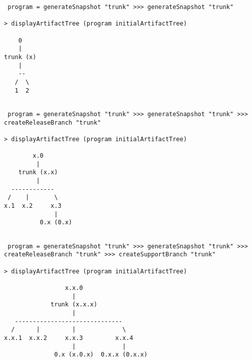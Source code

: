 \documentclass[11pt]{article}
\begin{document}
 \begin{lstlisting}
 program = generateSnapshot "trunk" >>> generateSnapshot "trunk"
 
> displayArtifactTree (program initialArtifactTree)
 
    0    
    |    
trunk (x)
    |    
    --   
   /  \  
   1  2  
 
 \end{lstlisting}
 
  \begin{lstlisting}
 program = generateSnapshot "trunk" >>> generateSnapshot "trunk" >>> createReleaseBranch "trunk"
 
> displayArtifactTree (program initialArtifactTree)
 
        x.0        
         |         
    trunk (x.x)    
         |         
  ------------     
 /    |       \    
x.1  x.2     x.3   
              |    
          0.x (0.x)
 
 \end{lstlisting}
 \begin{lstlisting}
 program = generateSnapshot "trunk" >>> generateSnapshot "trunk" >>> createReleaseBranch "trunk" >>> createSupportBranch "trunk"
 
> displayArtifactTree (program initialArtifactTree)
 
                 x.x.0                  
                   |                    
             trunk (x.x.x)              
                   |                    
   ------------------------------       
  /      |         |             \      
x.x.1  x.x.2     x.x.3         x.x.4    
                   |             |      
              0.x (x.0.x)  0.x.x (0.x.x)

 
 \end{lstlisting}


%
\end{document}
